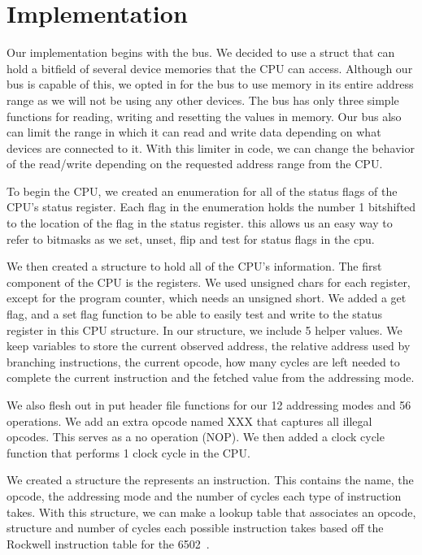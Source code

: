 \documentclass[12pt]{article}
\begin{document}
\section{Implementation}
\label{sec:implementation}

Our implementation begins with the bus. We decided to use a struct that can hold a bitfield
of several device memories that the CPU can access. Although our bus is capable of this, we opted
in for the bus to use memory in its entire address range as we will not be using any other devices.
The bus has only three simple functions for reading, writing and resetting the values in memory.
Our bus also can limit the range in which it can read and write data depending on what devices
are connected to it. With this limiter in code, we can change the behavior of the read/write depending on
the requested address range from the CPU.

To begin the CPU, we created an enumeration for all of the status flags of the CPU's status register.
Each flag in the enumeration holds the number 1 bitshifted to the location of the flag in the status register.
this allows us an easy way to refer to bitmasks as we set, unset, flip and test for status flags in the cpu.

We then created a structure to hold all of the CPU's information. The first component of the CPU is the 
registers. We used unsigned chars for each register, except for the program counter, which needs an unsigned short.
We added a get flag, and a set flag function to be able to easily test and write to the status register
in this CPU structure. In our structure, we include 5 helper values. We keep variables to store the current
observed address, the relative address used by branching instructions, the current opcode, how many
cycles are left needed to complete the current instruction and the fetched value from the addressing mode.

We also flesh out in put header file functions for our 12 addressing modes and 56 operations. We add
an extra opcode named XXX that captures all illegal opcodes. This serves as a no operation (NOP). We then
added a clock cycle function that performs 1 clock cycle in the CPU.

We created a structure the represents an instruction. This contains the name, the opcode, the addressing mode
and the number of cycles each type of instruction takes. With this structure, we can make a lookup table that
associates an opcode, structure and number of cycles each possible instruction takes based off the Rockwell instruction table
for the 6502~\cite{6502}.
\end{document}
